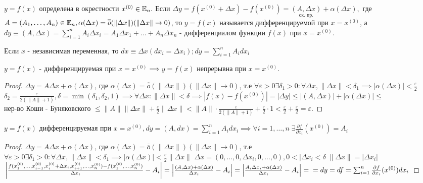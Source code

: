 \documentclass[../main.tex]{subfiles}
\begin{document}
\begin{definition}
    $y=f(x)$ определена в окрестности $x^{(0)}\in \mathbb{E}_{n}.$ Если $\Delta y = f(x^{(0)}+\Delta x) - f(x^{(0)})= \underset{\text{ск. пр.}}{(A,\Delta x)} + \alpha(\Delta x),$ где $A = (A_{1}, \dots , A_{n})\in \mathbb{E}_{n}, \alpha (\Delta x) = \overline{\overline{o}}(\| \Delta x\| )(\|\Delta x\| \to 0)$, то $y=f(x)$ называется дифференцируемой при $x=x^{(0)}$, а $dy \equiv (A,\Delta x)= \sum_{i =1}^{n}A_{i}\Delta x_{i}  = A_{1}\Delta x_{1} + \dots+ A_{n}\Delta x_{n}$ - дифференциалом функции $f(x)$ при $x=x^{(0)}$.
 \end{definition}
Если $x $ - независимая переменная, то $dx \equiv  \Delta x(dx_{i}=\Delta x_{i}); dy = \sum_{i  =1}^{n  } A_{i}dx_{i}$
\begin{theorem}
    $y=f(x)$ - дифференцируемая при $x=x^{(0)}\implies y=f(x)$ непрерывна при $x=x^{(0)}$.
\end{theorem}
\begin{proof}
    $\Delta y = A\Delta x + \alpha(\Delta x) $, где $\alpha (\Delta x )= \overline{\overline{o}}(\| \Delta x\| )(\|\Delta x\| \to 0) $, т.е $\forall \varepsilon > 0 \exists \delta_{1}> 0 : \forall \Delta x, \|\Delta x\| < \delta_{1} \implies |\alpha(\Delta x)|< \frac{\varepsilon}{2}$
    \\$\delta_{2} = \frac{\varepsilon}{2(\|A\| + 1)}, \delta = \min{(\delta_{1},\delta_{2},1)} \implies \forall \Delta x : \|\Delta x\| < \delta \implies \left| f(x) - f(x^{(0)})\right| = |\Delta y | \leqslant |(A,\Delta x )| + |\alpha(\Delta x)| \leqslant$ \\ нер-во Коши - Буняковского  $\leqslant\|A\|\|\Delta x\| + \frac{\varepsilon}{2}\| \Delta x\| < \|A\|\cdot \frac{\varepsilon}{2(\|A\| + 1)} + \frac{\varepsilon}{2}\cdot 1 < \frac{\varepsilon}{2} + \frac{\varepsilon}{2} = \varepsilon$.  
\end{proof}
\begin{theorem}
    $y=f(x)$ дифференцируемая при $x=x^{(0)}, dy = (A,dx) = \sum_{i=1}^{n}  A_{i}dx_{i} \implies \forall i = 1, \dots , n \; \exists \frac{\partial f}{\partial x_{i}}(x^{(0)}) = A_{i} $
\end{theorem}
\begin{proof}
    $\Delta y = A\Delta x + \alpha(\Delta x) $, где $ \alpha (\Delta x )= \overline{\overline{o}}(\| \Delta x\| )(\|\Delta x\| \to 0) $, т.е $\forall \varepsilon > 0 \exists \delta_{1}> 0 : \forall \Delta x, \|\Delta x\| < \delta_{1} \implies |\alpha(\Delta x)|< \frac{\varepsilon}{2} \| \Delta x\|$\qquad 
    $\Delta x = (0,\dots, 0 , \Delta x_{i}, 0 , \dots, 0), 0 < |\Delta x_{i} < \delta \; \| \Delta x \| = |\Delta x_{i}| $\\ 
    $\left| \frac{ f(x_{1}^{(0)},\dots,x_{i-1}^{(0)},x_{i}^{(0)}+\Delta x_{i}, x_{i+1}^{(0)},\dots,x_{n}^{(0)})- f(x_{1}^{(0)},\dots,x_{n}^{(0)})}{\Delta x_{i}} - A_{i}\right| = \left| \frac{(A,\Delta x) + \alpha (\Delta x)}{ \Delta x_{i}}-A_{i}\right| = \left| \frac{A_{i}\Delta x_{i}+ \alpha(\Delta x)}{\Delta x_{i}} - A_{i}\right| =\\= dy = df = \sum_{i   =1}^{n  } \frac{\partial{f}}{\partial{x_{i}}}(x^{(0)})dx_{i}$
\end{proof}
\end{document}
